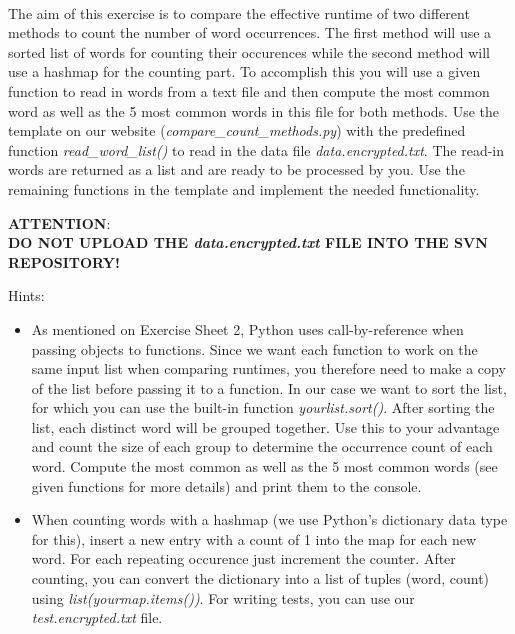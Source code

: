  \\
  The aim of this exercise is to compare the effective runtime of two different methods to count the number of word occurrences. 
  The first method will use a sorted list of words for counting their occurences while the second method will use a hashmap for the counting part.
  To accomplish this you will use a given function to read in words from a text file and then compute the most common word as well as the 5 most common words in this file for both methods.
  Use the template on our website (\textit{compare\_count\_methods.py}) with the predefined function \textit{read\_word\_list()} to read in the data file \textit{data.encrypted.txt}. 
  The read-in words are returned as a list and are ready to be processed by you. 
  Use the remaining functions in the template and implement the needed functionality.

\textbf{ATTENTION}:\\
    \textbf{DO NOT UPLOAD THE \textit{data.encrypted.txt} FILE INTO THE SVN REPOSITORY!}

Hints:
\begin{itemize}
  \item
    As mentioned on Exercise Sheet 2, Python uses call-by-reference when passing objects to functions. 
    Since we want each function to work on the same input list when comparing runtimes, you therefore need to make a copy of the list before passing it to a function. 
    In our case we want to sort the list, for which you can use the built-in function \textit{yourlist.sort()}. 
    After sorting the list, each distinct word will be grouped together.
    Use this to your advantage and count the size of each group to determine the occurrence count of each word.
    Compute the most common as well as the 5 most common words (see given functions for more details) and print them to the console.
  \item
    When counting words with a hashmap (we use Python's dictionary data type for this), insert a new entry with a count of 1 into the map for each new word. For each repeating occurence just increment the counter.
    After counting, you can convert the dictionary into a list of tuples (word, count) using \textit{list(yourmap.items())}. For writing tests, you can use our \textit{test.encrypted.txt} file.
\end{itemize}

